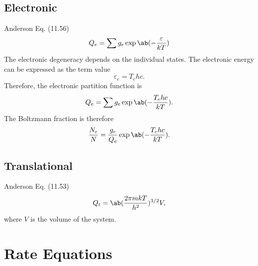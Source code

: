 \documentclass[11pt, twoside, fleqn]{report}
\begin{document}
    \subsection{Electronic}

    Anderson Eq. (11.56)
    \begin{equation*}
        Q_{e} = \sum g_{e}\exp\ab(-\frac{\varepsilon}{kT})
    \end{equation*}
    The electronic degeneracy depends on the individual states. The electronic energy can be expressed as the term value
    \begin{equation*}
        \varepsilon_{e} = T_{e}hc.
    \end{equation*}
    Therefore, the electronic partition function is
    \begin{equation*}
        Q_{e} = \sum g_{e}\exp\ab(-\frac{T_{e}hc}{kT}).
    \end{equation*}
    The Boltzmann fraction is therefore
    \begin{equation*}
        \frac{N_{e}}{N} = \frac{g_{e}}{Q_{e}}\exp\ab(-\frac{T_{e}hc}{kT}).
    \end{equation*}

    \subsection{Translational}

    Anderson Eq. (11.53)
    \begin{equation*}
        Q_{t} = \ab(\frac{2\pi mkT}{h^{2}})^{3/2}V,
    \end{equation*}
    where $V$ is the volume of the system.

    \section{Rate Equations}
\end{document}
